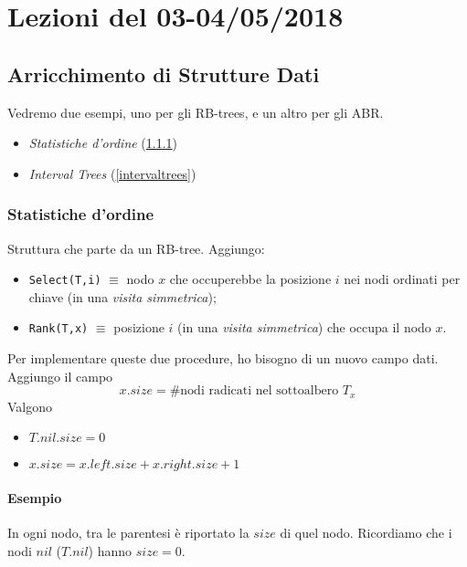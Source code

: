 \section{Lezioni del 03-04/05/2018}

\subsection{Arricchimento di Strutture Dati}

Vedremo due esempi, uno per gli RB-trees, e un altro per gli ABR.
\begin{itemize}[noitemsep]
    \item \emph{Statistiche d'ordine} (\ref{statistichedordine})
    \item \emph{Interval Trees} (\ref{intervaltrees})
\end{itemize}

\subsubsection{Statistiche d'ordine} \label{statistichedordine}
Struttura che parte da un RB-tree. Aggiungo:
\begin{itemize}
    \item \texttt{Select(T,i)} $\equiv$ nodo $x$ che occuperebbe la posizione $i$
        nei nodi ordinati per chiave (in una \emph{visita simmetrica});
    \item \texttt{Rank(T,x)} $\equiv$ posizione $i$ (in una \emph{visita simmetrica}) 
        che occupa il nodo $x$. 
\end{itemize}

Per implementare queste due procedure, ho bisogno di un nuovo campo dati. 
Aggiungo il campo 
$$x.size = \# \text{nodi radicati nel sottoalbero } T_x$$ 
Valgono
\begin{itemize}[label=,noitemsep]
    \item $T.nil.size = 0$
    \item $x.size = x.left.size + x.right.size + 1$
\end{itemize}

\paragraph{Esempio} In ogni nodo, tra le parentesi
è riportato la $size$ di quel nodo. Ricordiamo che i nodi $nil$ ($T.nil$)
hanno $size = 0$.

